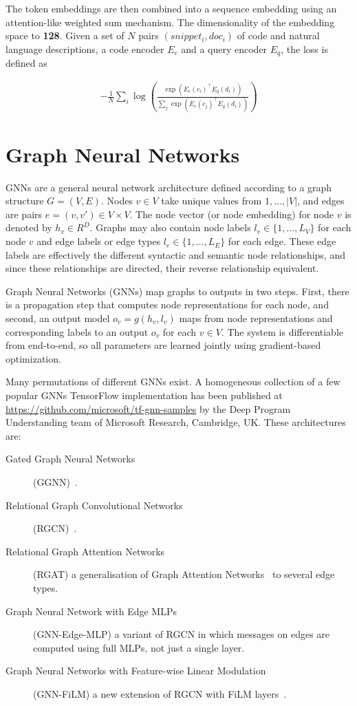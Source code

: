 \documentclass{article}
\begin{document}
The token embeddings are then combined into a sequence embedding using an attention-like weighted sum mechanism. The dimensionality of the embedding space to \textbf{128}.
Given a set of $N$ pairs $(snippet_i, doc_i)$ of code and natural language descriptions, a code encoder $E_c$ and a query encoder $E_q$, the loss is defined as 

\begin{align*}
  -\frac{1}{N}\sum_i
        \log\left(\frac{\exp(E_c(c_i)^\top E_q(d_i))}
                       {\sum_ j \exp(E_c(c_j)^\top E_q(d_i))}\right)
\end{align*}

\section{Graph Neural Networks}

GNNs are a general neural network architecture defined according to a graph structure $G = (V, E)$. Nodes $v \in V$ take unique values from $1, . . . , |V|$, and edges are pairs $e = (v, v') \in V \times V$. 
The node vector (or node embedding) for node $v$ is denoted by $h_v \in R^D$. Graphs may also contain node labels $l_v \in \{1, . . . , L_V \}$ for each node $v$ and edge labels or edge types $l_e \in \{1, . . . , L_E \}$ for each edge. These edge labels are effectively the different syntactic and semantic node relationships, and since these relationships are directed, their reverse relationship equivalent.

Graph Neural Networks (GNNs) map graphs to outputs in two steps. First, there is a propagation step that computes node representations for each node, and second, an output model $o_v = g(h_v, l_v)$ maps from node representations and corresponding labels to an output $o_v$ for each $v \in V$. The system is differentiable from end-to-end, so all parameters are learned jointly using gradient-based optimization\cite{1511.05493}.

Many permutations of different GNNs exist. A homogeneous collection of a few popular GNNs TensorFlow implementation has been published at \url{https://github.com/microsoft/tf-gnn-samples} by the Deep Program Understanding team of  Microsoft Research, Cambridge, UK. 
These architectures are:
\begin{description}
    \item[Gated Graph Neural Networks] (GGNN)~\cite{1511.05493}.
    \item[Relational Graph Convolutional Networks] (RGCN)~\cite{1703.06103}.
    \item[Relational Graph Attention Networks] (RGAT) a generalisation of Graph Attention Networks~\cite{1710.10903} to several edge types.
    \item[Graph Neural Network with Edge MLPs] (GNN-Edge-MLP) a variant of RGCN in which messages on edges are computed using full MLPs, not just a single layer.
    \item[Graph Neural Networks with Feature-wise Linear Modulation] (GNN-FiLM) a new extension of RGCN with FiLM layers~\cite{1709.07871}.
\end{description}
\end{document}
